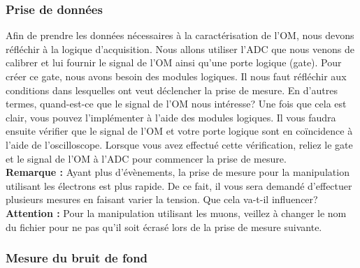 \subsubsection{Prise de données}

Afin de prendre les données nécessaires à la caractérisation de l'OM, nous devons réfléchir à la logique d'acquisition. Nous allons utiliser l'ADC que nous venons de calibrer et lui fournir le signal de l'OM ainsi qu'une porte logique (gate). Pour créer ce gate, nous avons besoin des modules logiques. Il nous faut réfléchir aux conditions dans lesquelles ont veut déclencher la prise de mesure. En d'autres termes, quand-est-ce que le signal de l'OM nous intéresse? Une fois que cela est clair, vous pouvez l'implémenter à l'aide des modules logiques. Il vous faudra ensuite vérifier que le signal de l'OM et votre porte logique sont en coïncidence à l'aide de l'oscilloscope. Lorsque vous avez effectué cette vérification, reliez le gate et le signal de l'OM à l'ADC pour commencer la prise de mesure.\\

\textbf{Remarque :} Ayant plus d'évènements, la prise de mesure pour la manipulation utilisant les électrons est plus rapide. De ce fait, il vous sera demandé d'effectuer plusieurs mesures en faisant varier la tension. Que cela va-t-il influencer? \\

\textbf{Attention :} Pour la manipulation utilisant les muons, veillez à changer le nom du fichier pour ne pas qu'il soit écrasé lors de la prise de mesure suivante.


\subsubsection{Mesure du bruit de fond}

